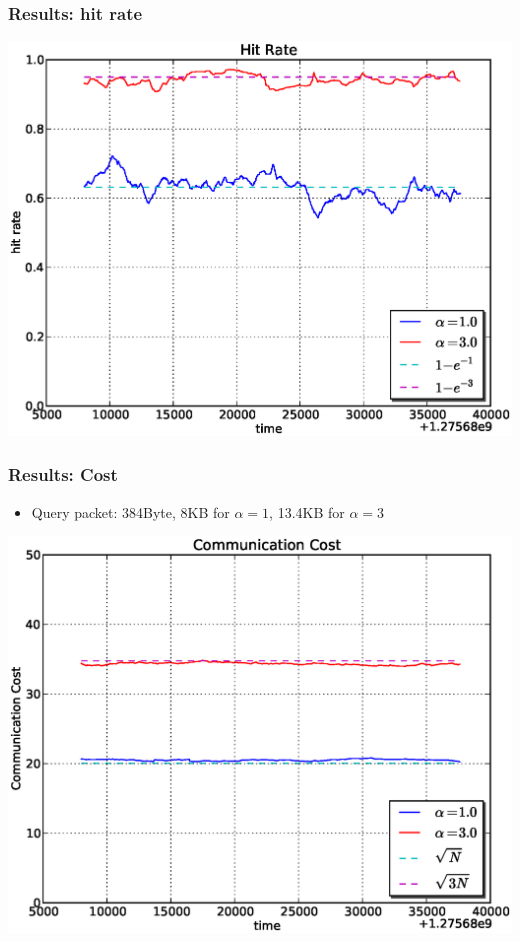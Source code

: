 \documentclass[red]{beamer}
\begin{document}
\begin{frame}
\frametitle{Results: hit rate}
\begin{center}
\includegraphics[scale=0.4]{figs/plab_hit.eps}
\end{center}
\end{frame}

\begin{frame}
\frametitle{Results: Cost}
\begin{itemize}
\item Query packet: 384Byte, 8KB for $\alpha=1$, 13.4KB for $\alpha=3$
\end{itemize}
\begin{center}
\includegraphics[scale=0.4]{figs/plab_cost.eps}
\end{center}
\end{frame}
\end{document}
